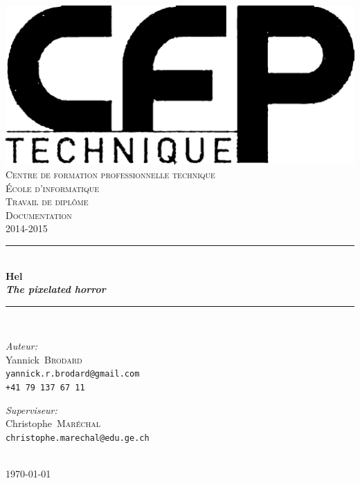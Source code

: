 \documentclass[11pt, a4paper, oneside]{report}
\makeatletter
\newcommand{\HRule}{\rule{\linewidth}{0.5mm}}
\newcommand{\teacherlastname}{Maréchal}
\newcommand{\teacherfirstname}{Christophe}
\newcommand{\teacheremail}{christophe.marechal@edu.ge.ch}
\newcommand{\schoolyear}{2014-2015}
\newcommand{\candidatelastname}{Brodard}
\newcommand{\candidatefirstname}{Yannick}
\newcommand{\candidatephone}{+41 79 137 67 11}
\newcommand{\candidateemail}{yannick.r.brodard@gmail.com}
\newcommand{\projectTitle}{Hel}
\newcommand{\projectSubTitle}{The pixelated horror}
\makeatother
\begin{document}
\begin{titlepage}
	\begin{center}
		\vspace*{\fill}
		\includegraphics[width=.5\textwidth]{cfpt_logo}\\[.4cm]
		\textsc{\Large Centre de formation professionnelle technique\\École d'informatique}\\[.4cm]
		\textsc{\Large Travail de diplôme}\\[.1cm]
		\textsc{\Large Documentation}\\[0.4cm]
		\textsc{\large \schoolyear}\\[0.4cm]
		
		\HRule \\[0.4cm]
		{ \huge \bfseries \projectTitle \\[0.4cm] }
		{ \Large \bfseries \emph{\projectSubTitle} \\[0.4cm] }
		\HRule \\[1.5cm]
		
		\noindent
		\begin{minipage}{0.4\textwidth}
		\begin{flushleft} \large
		\emph{Auteur:}\\
		\candidatefirstname \textsc{~\candidatelastname}\\[0.2cm]
		{\small
		\texttt{\candidateemail}\\
		\texttt{\candidatephone}
		}
		\end{flushleft}
		\end{minipage}%
		\begin{minipage}{0.4\textwidth}
		\begin{flushright} \large
		\emph{Superviseur:} \\
		\teacherfirstname \textsc{~\teacherlastname}\\[0.2cm]
		{\small
		\texttt{\teacheremail}\\
		~
		}
		\end{flushright}
		\end{minipage}
		
		\vspace*{\fill}
		
		{\large \today}
		
	\end{center}
\end{titlepage}
\end{document}
